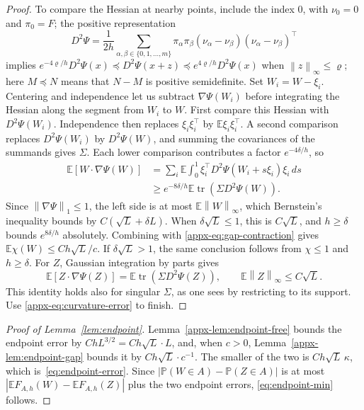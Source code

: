 \documentclass[11pt,letterpaper]{article}
\newif\ifshowrev
\newcommand{\rev}[1]{\ifshowrev{\color{revblue}%
\hypersetup{linkcolor=revblue,citecolor=revblue,urlcolor=revblue}#1}\else#1\fi}
\newcommand{\rs}[1]{\ifshowrev{\color{revblue}#1}\else#1\fi}
\newenvironment{revblock}{\ifshowrev\color{revblue}%
\hypersetup{linkcolor=revblue,citecolor=revblue,urlcolor=revblue}\fi}{}
\newif\ifshowtrim
\newcommand{\trim}[1]{\ifshowtrim{\color{revblue}%
\hypersetup{linkcolor=revblue,citecolor=revblue,urlcolor=revblue}#1}\else#1\fi}
\newcommand{\trs}[1]{\ifshowtrim{\color{revblue}#1}\else#1\fi}
\theoremstyle{remark}
\newcommand{\E}{\mathbb E}
\newcommand{\Pp}{\mathbb P}
\newcommand{\tr}{\operatorname{tr}}
\newcommand{\norm}[1]{\left\lVert#1\right\rVert}
\newcommand{\dd}{\,d}
\begin{document}
\begin{proof}
\rev{To compare the Hessian at nearby points, include \trim{the index \(0\), with}
\(\nu_0=0\) \trim{and \(\pi_0=F\)}; the positive representation}
\[
 D^2\Psi=\frac1{2h}\sum_{\alpha,\beta\in\trs{\{0,1,\ldots,m\}}}
 \pi_\alpha\pi_\beta
 (\nu_\alpha-\nu_\beta)(\nu_\alpha-\nu_\beta)^\top
\]
implies
\(e^{-4\rs\varrho/h}D^2\Psi(x)\preceq D^2\Psi(x+z)
\preceq e^{4\rs\varrho/h}D^2\Psi(x)\) when \(\norm z_\infty\le\rs\varrho\)\rev{;
here \(M\preceq N\) means that \(N-M\) is positive semidefinite}.
Set \(W_i=W-\xi_i\). Centering and independence let us subtract
\(\nabla\Psi(W_i)\) before integrating the Hessian along the segment
from \(W_i\) to \(W\). First compare this Hessian with
\(D^2\Psi(W_i)\). Independence then replaces
\(\xi_i\xi_i^\top\) by \(\E\xi_i\xi_i^\top\). A second comparison
replaces \(D^2\Psi(W_i)\) by \(D^2\Psi(W)\), and summing the \rs{covariances of the
summands} gives \(\Sigma\). Each lower comparison contributes a factor
\(e^{-4\delta/h}\), so
\[
 \begin{split}
 \E[W\cdot\nabla\Psi(W)]
 &=\sum_i\E\int_0^1
 \xi_i^\top D^2\Psi(W_i+s\xi_i)\xi_i\dd s\\
 &\ge e^{-8\delta/h}\E\tr(\Sigma D^2\Psi(W)).
 \end{split}
\]
Since \(\norm{\nabla\Psi}_1\le1\), the left side is at most
\(\E\norm W_\infty\), which Bernstein's inequality bounds by
\(C(\sqrt L+\delta L)\). When \(\delta\sqrt L\le1\), this is
\(C\sqrt L\), and \(h\ge\delta\) bounds \(e^{8\delta/h}\)
absolutely. Combining with \eqref{appx-eq:gap-contraction} gives
\(\E\chi(W)\le Ch\sqrt L/c\).
If \(\delta\sqrt L>1\), the same conclusion follows from
\(\chi\le1\) and \(h\ge\delta\).
For \(Z\), Gaussian integration by parts gives
\[
 \E[Z\cdot\nabla\Psi(Z)]
 =\E\tr(\Sigma D^2\Psi(Z)),\qquad
 \E\norm Z_\infty\le C\sqrt L.
\]
\rev{This identity holds also for singular \(\Sigma\), as one sees by
restricting to its support.} Use \eqref{appx-eq:curvature-error} to finish.
\end{proof}


\begin{revblock}
\begin{proof}[Proof of Lemma~\ref{lem:endpoint}]
Lemma~\ref{appx-lem:endpoint-free} bounds the endpoint error by
\(ChL^{3/2}=Ch\sqrt L\cdot L\), and, when \(c>0\),
Lemma~\ref{appx-lem:endpoint-gap} bounds it by \(Ch\sqrt L\cdot c^{-1}\).
The smaller of the two is \(Ch\sqrt L\,\kappa\), which
is~\eqref{eq:endpoint-error}. Since
\(|\Pp(W\in A)-\Pp(Z\in A)|\) is at most
\(|\E F_{A,h}(W)-\E F_{A,h}(Z)|\) plus the two endpoint errors,
\eqref{eq:endpoint-min} follows.
\end{proof}
\end{revblock}
\end{document}
